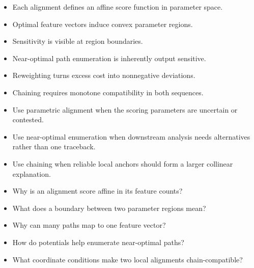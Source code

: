 \documentclass[11pt]{article}
\begin{document}
\begin{tcolorbox}[enhanced,breakable,title={Key takeaways},
  colback=white,colframe=Primary,fonttitle=\small\sffamily\bfseries,fontupper=\footnotesize,
  boxsep=0.6mm,left=1.5mm,right=1.5mm,top=1mm,bottom=1mm,before skip=3pt,after skip=3pt]
\begin{itemize}
  \item Each alignment defines an affine score function in parameter space.
  \item Optimal feature vectors induce convex parameter regions.
  \item Sensitivity is visible at region boundaries.
  \item Near-optimal path enumeration is inherently output sensitive.
  \item Reweighting turns excess cost into nonnegative deviations.
  \item Chaining requires monotone compatibility in both sequences.
\end{itemize}
\end{tcolorbox}

\begin{tcolorbox}[enhanced,breakable,title={Algorithm selection / when to use this},
  colback=Primary!3,colframe=Primary,fonttitle=\small\sffamily\bfseries,fontupper=\footnotesize,
  boxsep=0.6mm,left=1.5mm,right=1.5mm,top=1mm,bottom=1mm,before skip=3pt,after skip=3pt]
\begin{itemize}
  \item Use parametric alignment when the scoring parameters are uncertain or contested.
  \item Use near-optimal enumeration when downstream analysis needs alternatives rather than one traceback.
  \item Use chaining when reliable local anchors should form a larger collinear explanation.
\end{itemize}
\end{tcolorbox}

\begin{tcolorbox}[enhanced,breakable,title={Self-test questions},
  colback=white,colframe=Accent,fonttitle=\small\sffamily\bfseries,fontupper=\footnotesize,
  boxsep=0.6mm,left=1.5mm,right=1.5mm,top=1mm,bottom=1mm,before skip=3pt,after skip=3pt]
\begin{itemize}
  \item Why is an alignment score affine in its feature counts?
  \item What does a boundary between two parameter regions mean?
  \item Why can many paths map to one feature vector?
  \item How do potentials help enumerate near-optimal paths?
  \item What coordinate conditions make two local alignments chain-compatible?
\end{itemize}
\end{tcolorbox}
\end{document}
